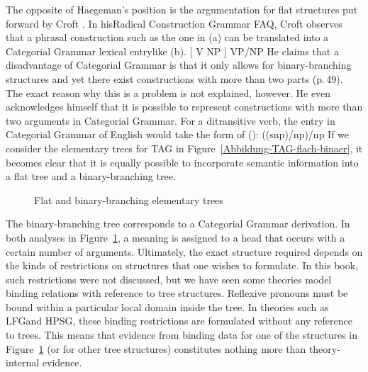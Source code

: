 The opposite of Haegeman's position is the argumentation for flat structures put forward by Croft
\citeyearpar[Section~1.6.2]{Croft2001a}. In his\indexcxg Radical Construction Grammar FAQ, Croft observes that
a phrasal construction such as the one in (a) can be translated into a Categorial Grammar
lexical entry\indexcg like (b).
\eal
\ex {}[ V NP ]
\ex VP/NP
\zl
He claims that a disadvantage of Categorial Grammar is that it only allows for binary-branching structures and yet there exist constructions
with more than two parts (p.\,49). The exact reason why this is a problem is not explained, however. He even acknowledges himself that
it is possible to represent constructions with more than two arguments in Categorial Grammar. For a ditransitive verb, the entry in Categorial
Grammar of English would take the form of ():
\ea
((s\bs np)/np)/np
\z
If we consider the elementary trees for TAG in Figure~\vref{Abbildung-TAG-flach-binaer}, it becomes clear that it is equally possible
to incorporate semantic information into a flat tree and a binary-branching tree.
\begin{figure}
\hfill
{}
\hfill
{}
\hfill\mbox{}
\caption{\label{Abbildung-TAG-flach-binaer}Flat and binary-branching elementary trees}
\end{figure}%
The binary-branching tree corresponds to a Categorial Grammar derivation. In both analyses in 
Figure~\ref{Abbildung-TAG-flach-binaer}, a meaning is assigned to a head that occurs with a certain
number of arguments. Ultimately, the exact structure required depends on the kinds of restrictions on structures
that one wishes to formulate.
In this book, such restrictions were not discussed, but we have seen some theories model binding relations
with reference to tree structures. Reflexive pronouns must be bound within a particular local domain inside the
tree. In theories such as LFG\indexlfg and HPSG\indexhpsg, these binding restrictions are formulated
without any reference to trees.
This means that evidence from binding data for one of the structures in Figure~\ref{Abbildung-TAG-flach-binaer} (or for
other tree structures) constitutes nothing more than theory-internal evidence.


